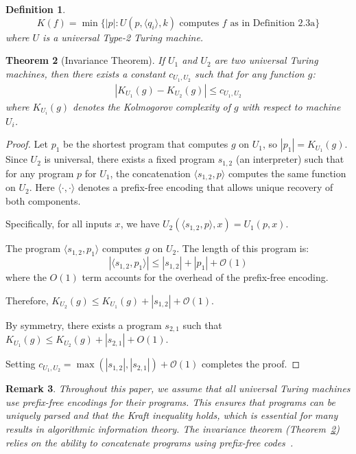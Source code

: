 \documentclass[11pt,letter,leqno]{article}
\newtheorem{theorem}{Theorem}[section]
\newtheorem{definition}[theorem]{Definition}
\newtheorem{remark}[theorem]{Remark}
\begin{document}
\begin{definition}
  \label{def:kolmogorov2}
\begin{equation}
K(f) = \min\{|p| : U(p, \langle q_i \rangle, k) \text{ computes } f \text{ as in Definition 2.3a}\}
\end{equation}
where $U$ is a universal Type-2 Turing machine.
\end{definition}

\begin{theorem}[Invariance Theorem]
\label{lemma:invariance}
If $U_1$ and $U_2$ are two universal Turing machines, then there exists a constant $c_{U_1,U_2}$ such that for any function $g$:
\begin{align}
|K_{U_1}(g) - K_{U_2}(g)| \leq c_{U_1,U_2}
\end{align}
where $K_{U_i}(g)$ denotes the Kolmogorov complexity of $g$ with respect to machine $U_i$.
\end{theorem}

\begin{proof}
Let $p_1$ be the shortest program that computes $g$ on $U_1$, so $|p_1| = K_{U_1}(g)$. Since $U_2$ is universal, there exists a fixed program $s_{1,2}$ (an interpreter) such that for any program $p$ for $U_1$, the concatenation $\langle s_{1,2}, p \rangle$ computes the same function on $U_2$. Here $\langle \cdot, \cdot \rangle$ denotes a prefix-free encoding that allows unique recovery of both components.

Specifically, for all inputs $x$, we have $U_2(\langle s_{1,2}, p \rangle, x) = U_1(p, x)$.

The program $\langle s_{1,2}, p_1 \rangle$ computes $g$ on $U_2$. The length of this program is:
\begin{equation}
|\langle s_{1,2}, p_1 \rangle| \leq |s_{1,2}| + |p_1| + \mathcal{O}(1)
\end{equation}
where the $O(1)$ term accounts for the overhead of the prefix-free encoding.

Therefore, $K_{U_2}(g) \leq K_{U_1}(g) + |s_{1,2}| + \mathcal{O}(1)$.

By symmetry, there exists a program $s_{2,1}$ such that $K_{U_1}(g) \leq K_{U_2}(g) + |s_{2,1}| + O(1)$.

Setting $c_{U_1,U_2} = \max(|s_{1,2}|, |s_{2,1}|) + \mathcal{O}(1)$ completes the proof.
\end{proof}

\begin{remark} \label{rem:concatenate}
Throughout this paper, we assume that all universal Turing machines use prefix-free encodings for their programs. This ensures that programs can be uniquely parsed and that the Kraft inequality holds, which is essential for many results in algorithmic information theory.  The invariance theorem (Theorem~\ref{lemma:invariance}) relies on the ability to concatenate programs using prefix-free codes~\cite{Li2008}.
\end{remark}
\end{document}
